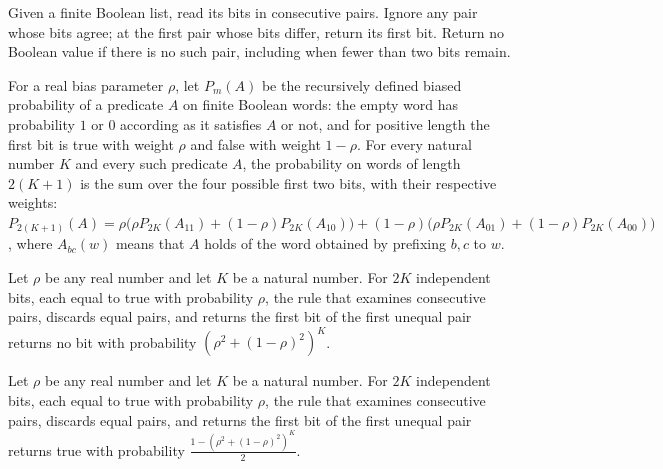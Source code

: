 \begin{definition}
\label{Randomized.vonNeumannRun}
\leanok
Given a finite Boolean list, read its bits in consecutive pairs. Ignore any pair whose
bits agree; at the first pair whose bits differ, return its first bit. Return no Boolean
value if there is no such pair, including when fewer than two bits remain.
\end{definition}

\begin{theorem}
\label{Randomized.biasedProb_two}
\leanok
{}
For a real bias parameter $\rho$, let $P_m(A)$ be the recursively defined biased
probability of a predicate $A$ on finite Boolean words: the empty word has probability
$1$ or $0$ according as it satisfies $A$ or not, and for positive length the first bit
is true with weight $\rho$ and false with weight $1-\rho$. For every natural number $K$
and every such predicate $A$, the probability on words of length $2(K+1)$ is the sum
over the four possible first two bits, with their respective weights:
$P_{2(K+1)}(A)=\rho\bigl(\rho
P_{2K}(A_{11})+(1-\rho)P_{2K}(A_{10})\bigr)+(1-\rho)\bigl(\rho
P_{2K}(A_{01})+(1-\rho)P_{2K}(A_{00})\bigr)$, where $A_{bc}(w)$ means that $A$ holds of
the word obtained by prefixing $b,c$ to $w$.
\end{theorem}

\begin{theorem}
\label{Randomized.vonNeumann_none}
\leanok
{}
Let $\rho$ be any real number and let $K$ be a natural number. For $2K$ independent
bits, each equal to true with probability $\rho$, the rule that examines consecutive
pairs, discards equal pairs, and returns the first bit of the first unequal pair returns
no bit with probability $(\rho^2+(1-\rho)^2)^K$.
\end{theorem}

\begin{theorem}
\label{Randomized.vonNeumann_heads}
\leanok
{}
Let $\rho$ be any real number and let $K$ be a natural number. For $2K$ independent
bits, each equal to true with probability $\rho$, the rule that examines consecutive
pairs, discards equal pairs, and returns the first bit of the first unequal pair returns
true with probability $\frac{1-(\rho^2+(1-\rho)^2)^K}{2}$.
\end{theorem}

